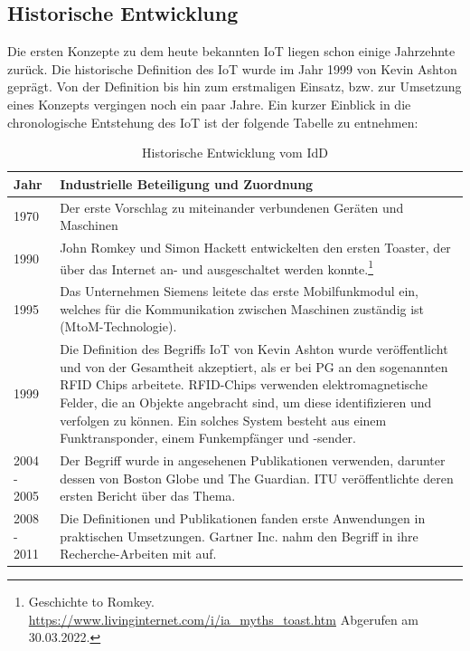     \subsection{Historische Entwicklung}
        Die ersten Konzepte zu dem heute bekannten \acs{IoT} liegen schon einige Jahrzehnte zurück. 
        Die historische Definition des \acl{IoT} wurde im Jahr 1999 von Kevin Ashton geprägt. Von der 
        Definition bis hin zum erstmaligen Einsatz, bzw. zur Umsetzung eines Konzepts vergingen noch 
        ein paar Jahre. Ein kurzer Einblick in die chronologische Entstehung des \acs{IoT} ist der 
        folgende Tabelle zu entnehmen: 
        \begin{table}[hbt!]
            \begin{center}
                \begin{tabular}{| p{3cm} | p{12.75cm} | }
                    \hline
                        \textbf{Jahr} & \textbf{Industrielle Beteiligung und Zuordnung} \\
                    \hline
                        1970 & Der erste Vorschlag zu miteinander verbundenen Geräten und Maschinen \\ 
                    \hline
                        1990 & John Romkey und Simon Hackett entwickelten den ersten Toaster, der über das Internet an- und ausgeschaltet werden konnte.\footnote{Geschichte to Romkey. \url{https://www.livinginternet.com/i/ia_myths_toast.htm} Abgerufen am 30.03.2022.} \\ 
                    \hline
                        1995 & Das Unternehmen Siemens leitete das erste Mobilfunkmodul ein, welches für die Kommunikation zwischen Maschinen zuständig ist (\acs{MtoM}-Technologie).\\ 
                    \hline
                        1999 & Die Definition des Begriffs \acs{IoT} von Kevin Ashton wurde veröffentlicht und von der Gesamtheit akzeptiert, als er bei \ac{PG} an den sogenannten \ac{RFID} Chips arbeitete. \acs{RFID}-Chips verwenden elektromagnetische Felder, die an Objekte angebracht sind, um diese identifizieren und verfolgen zu können. Ein solches System besteht aus einem Funktransponder, einem Funkempfänger und -sender. \\ 
                    \hline
                        2004 - 2005 & Der Begriff wurde in angesehenen Publikationen verwenden, darunter dessen von Boston Globe und The Guardian. \ac{ITU} veröffentlichte deren ersten Bericht über das Thema. \\ 
                    \hline
                        2008 - 2011 & Die Definitionen und Publikationen fanden erste Anwendungen in praktischen Umsetzungen. Gartner Inc. nahm den Begriff in ihre Recherche-Arbeiten mit auf. \\ 
                    \hline
                \end{tabular}
            \end{center}
            \caption{Historische Entwicklung vom \acl{IdD} \cite{Durga2020}}
            \label{table:iothistory}
        \end{table}
